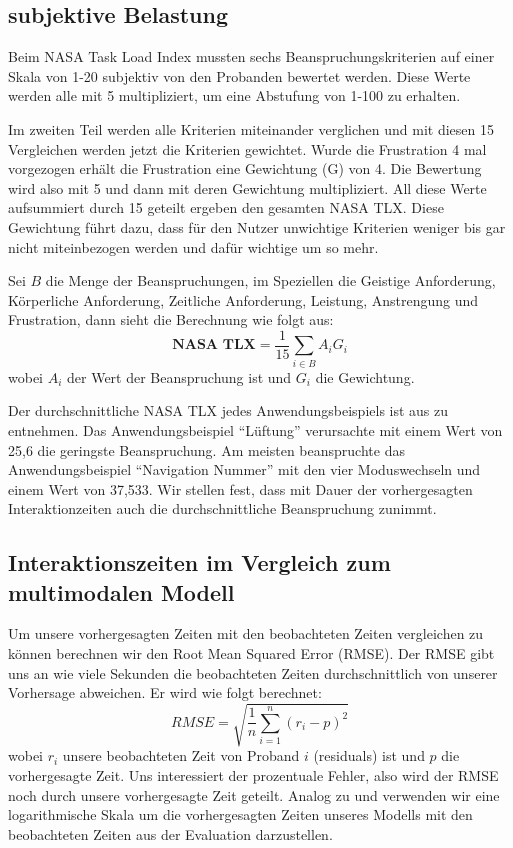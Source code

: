 \subsection{subjektive Belastung}
Beim NASA Task Load Index mussten sechs Beanspruchungskriterien auf einer Skala von 1-20 subjektiv von den Probanden bewertet werden.
Diese Werte werden alle mit 5 multipliziert, um eine Abstufung von 1-100 zu erhalten. 

Im zweiten Teil werden alle Kriterien miteinander verglichen und mit diesen 15 Vergleichen werden jetzt die Kriterien gewichtet.
Wurde die Frustration 4 mal vorgezogen erhält die Frustration eine Gewichtung (G) von 4.
Die Bewertung wird also mit 5 und dann mit deren Gewichtung multipliziert.
All diese Werte aufsummiert durch 15 geteilt ergeben den gesamten NASA TLX.
Diese Gewichtung führt dazu, dass für den Nutzer unwichtige Kriterien weniger bis gar nicht miteinbezogen werden und dafür wichtige um so mehr. 

Sei $B$ die Menge der Beanspruchungen, im Speziellen die Geistige Anforderung, Körperliche Anforderung, Zeitliche Anforderung, Leistung, Anstrengung und Frustration, dann sieht die Berechnung wie folgt aus:
\[
\textbf{NASA TLX} =\frac{1}{15}\sum_{i \in B}A_{i}G_{i}
\]
wobei $A_i$ der Wert der Beanspruchung ist und $G_i$ die Gewichtung.

Der durchschnittliche NASA TLX jedes Anwendungsbeispiels ist aus  zu entnehmen.
Das Anwendungsbeispiel "`Lüftung"' verursachte mit einem Wert von 25,6 die geringste Beanspruchung.
Am meisten beanspruchte das Anwendungsbeispiel "`Navigation Nummer"' mit den vier Moduswechseln und einem Wert von 37,533.
Wir stellen fest, dass mit Dauer der vorhergesagten Interaktionzeiten auch die durchschnittliche Beanspruchung zunimmt.

\subsection[Ergebnisse der Interaktionszeiten]{Interaktionszeiten im Vergleich zum multimodalen Modell}
Um unsere vorhergesagten Zeiten mit den beobachteten Zeiten vergleichen zu können berechnen wir den Root Mean Squared Error (RMSE). 
Der RMSE gibt uns an wie viele Sekunden die beobachteten Zeiten durchschnittlich von unserer Vorhersage abweichen.
Er wird wie folgt berechnet:
\[
RMSE = \sqrt{\frac{1}{n}\sum_{i=1}^{n}(r_i - p)^2}
\]
wobei $r_i$ unsere beobachteten Zeit von Proband $i$ (residuals) ist und $p$ die vorhergesagte Zeit.
Uns interessiert der prozentuale Fehler, also wird der RMSE noch durch unsere vorhergesagte Zeit geteilt.
Analog zu \citep{Card_1980} und \citep{schneegass_2009} verwenden wir eine logarithmische Skala um die vorhergesagten Zeiten unseres Modells mit den beobachteten Zeiten aus der Evaluation darzustellen. 

